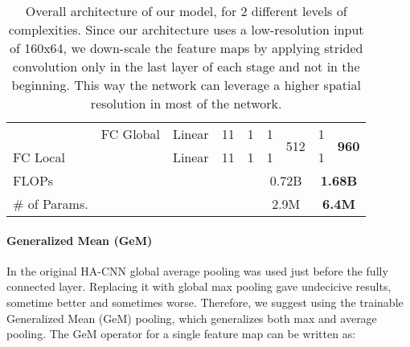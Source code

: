 \documentclass[sigconf]{acmart}
\begin{document}
\begin{table*}
\begin{tabular}{|l|c|c|c|c|c|c|c|c|}
\hline
                              & FC Global                      & Linear                                                                     & 11                        & 1                                                  & 1                                                  & \multirow{2}{*}{512} & 1                                                           & \multirow{2}{*}{\textbf{960}}    \\
\cline{1-6}\cline{8-8}
FC Local                     &                                & Linear                                                                     & 11                        & 1                                                  & 1                                                  &                      & 1                                                           &                                  \\
\hline
\hline
FLOPs                         & \multicolumn{4}{c|}{}                                                                                                                                                                                & \multicolumn{2}{c|}{0.72B}                                                & \multicolumn{2}{c|}{\textbf{1.68B }}                                                           \\
\hline
\# of Params.                 & \multicolumn{4}{c|}{}                                                                                                                                                                                & \multicolumn{2}{c|}{2.9M}                                                 & \multicolumn{2}{c|}{\textbf{6.4M }}                                                            \\
\hline

\end{tabular}
\medskip
\caption{Overall architecture of our model, for 2 different levels of complexities. Since our architecture uses a low-resolution input of 160x64, we down-scale the feature maps by applying strided convolution only in the last layer of each stage and not in the beginning. This way the network can leverage a higher spatial resolution in most of the network.}
\label{tab:arch}
\end{table*}

\paragraph{Generalized Mean (GeM) \cite{radenovic2018fine}}
In the original HA-CNN global average pooling was used just before the fully connected layer.
Replacing it with global max pooling gave undecicive results, sometime better and sometimes worse. Therefore, we suggest using the trainable Generalized Mean (GeM) pooling, which generalizes both max and average pooling.
The GeM operator for a single feature map  can be written as:
\end{document}
